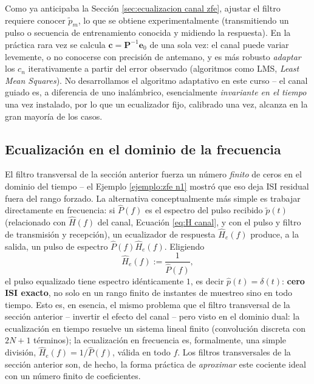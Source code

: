 Como ya anticipaba la Sección \ref{sec:ecualizacion canal zfe}, ajustar el filtro requiere conocer $\tilde p_m$, lo que se obtiene experimentalmente (transmitiendo un pulso o secuencia de entrenamiento conocida y midiendo la respuesta). En la práctica rara vez se calcula $\mathbf c=\mathbf P^{-1}\mathbf e_0$ de una sola vez: el canal puede variar levemente, o no conocerse con precisión de antemano, y es más robusto \emph{adaptar} los $c_n$ iterativamente a partir del error observado (algoritmos como LMS, \emph{Least Mean Squares}). No desarrollamos el algoritmo adaptativo en este curso -- el canal guiado es, a diferencia de uno inalámbrico, esencialmente \emph{invariante en el tiempo} una vez instalado, por lo que un ecualizador fijo, calibrado una vez, alcanza en la gran mayoría de los casos.

\subsection*{Ecualización en el dominio de la frecuencia}

El filtro transversal de la sección anterior fuerza un número \emph{finito} de ceros en el dominio del tiempo -- el Ejemplo \ref{ejemplo:zfe n1} mostró que eso deja ISI residual fuera del rango forzado. La alternativa conceptualmente más simple es trabajar directamente en frecuencia: si $\hat P(f)$ es el espectro del pulso recibido $\tilde p(t)$ (relacionado con $\hat H(f)$ del canal, Ecuación \eqref{eq:H canal}, y con el pulso y filtro de transmisión y recepción), un ecualizador de respuesta $\hat H_e(f)$ produce, a la salida, un pulso de espectro $\hat P(f)\hat H_e(f)$. Eligiendo
\begin{equation*}
    \hat H_e(f) := \frac{1}{\hat P(f)},
\end{equation*}
el pulso equalizado tiene espectro idénticamente $1$, es decir $\hat p(t)=\delta(t)$: \textbf{cero ISI exacto}, no solo en un rango finito de instantes de muestreo sino en todo tiempo. Esto es, en esencia, el mismo problema que el filtro transversal de la sección anterior -- invertir el efecto del canal -- pero visto en el dominio dual: la ecualización en tiempo resuelve un sistema lineal finito (convolución discreta con $2N+1$ términos); la ecualización en frecuencia es, formalmente, una simple división, $\hat H_e(f)=1/\hat P(f)$, válida en todo $f$. Los filtros transversales de la sección anterior son, de hecho, la forma práctica de \emph{aproximar} este cociente ideal con un número finito de coeficientes.

